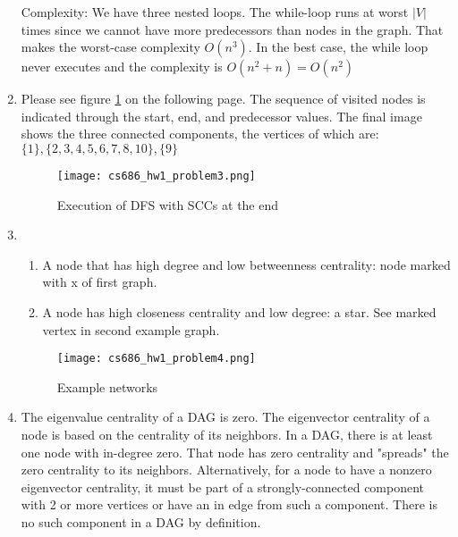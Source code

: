 \documentclass[]{article}
\begin{document}
\begin{enumerate}
\begin{verbatim}
	\end{verbatim}

	Complexity:
	We have three nested loops. The while-loop runs at worst $|V|$ times since we cannot have more predecessors than nodes in the graph. That makes the worst-case complexity $O(n^3)$. In the best case, the while loop never executes and the complexity is $O(n^2+n) = O(n^2)$


	\item 	Please see figure \ref{fig:prob3} on the following page. The sequence of visited nodes is indicated through the start, end, and predecessor values. The final image shows the three connected components, the vertices of which are: $\{1\}, \{2,3,4,5,6,7,8,10\}, \{9\}$
	
	
	\begin{figure}[H]
		\texttt{[image: cs686\_hw1\_problem3.png]}
		\caption{Execution of DFS with SCCs at the end}
		\label{fig:prob3}
	\end{figure}


	\item \begin{minipage}[t]{\linewidth}
			\begin{enumerate}
				\item A node that has high degree and low betweenness centrality: node marked with x of first graph.
				
				\item A node has high closeness centrality and low degree: a star. See marked vertex in second example graph.
			\end{enumerate}
			\begin{figure}[H]
				\texttt{[image: cs686\_hw1\_problem4.png]}
				\caption{Example networks}
				\label{fig:prob4}
			\end{figure}
	\end{minipage} 

	\item The eigenvalue centrality of a DAG is zero. The eigenvector centrality of a node is based on the centrality of its neighbors. In a DAG, there is at least one node with in-degree zero. That node has zero centrality and "spreads" the zero centrality to its neighbors. Alternatively, for a node to have a nonzero eigenvector centrality, it must be part of a strongly-connected component with 2 or more vertices or have an in edge from such a component. There is no such component in a DAG by definition.
	

\end{enumerate}
\end{document}
